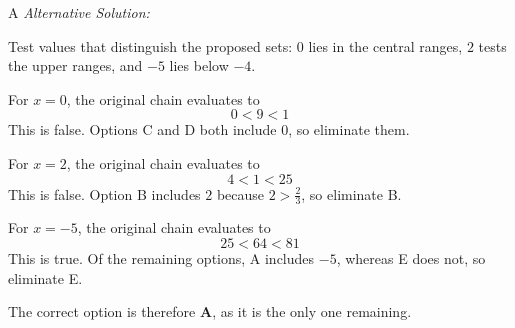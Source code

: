 \documentclass[11pt,a4paper]{article}
\begin{document}
\begin{enumerate}[label=\textbf{\arabic*.},leftmargin=*,itemsep=0pt,start=1]
\begin{djsSolution}{A}
\textit{Alternative Solution:}

Test values that distinguish the proposed sets: $0$ lies in the central ranges, $2$ tests the upper ranges, and $-5$ lies below $-4$.

For $x=0$, the original chain evaluates to
\[
0<9<1
\]
This is false. Options C and D both include $0$, so eliminate them.

For $x=2$, the original chain evaluates to
\[
4<1<25
\]
This is false. Option B includes $2$ because $2>\frac23$, so eliminate B.

For $x=-5$, the original chain evaluates to
\[
25<64<81
\]
This is true. Of the remaining options, A includes $-5$, whereas E does not, so eliminate E.

The correct option is therefore \textbf{A}, as it is the only one remaining.
\end{djsSolution}
\end{enumerate}
\clearpage
\thispagestyle{djssolutions}
\vspace*{8pt}
\end{document}
